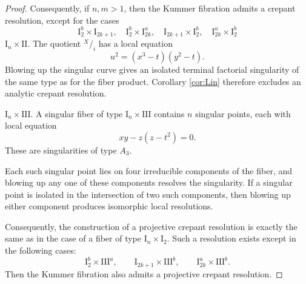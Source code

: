 \documentclass[a4paper]{amsart}
\theoremstyle{plain}
\theoremstyle{definition}
\theoremstyle{remark}
\numberwithin{equation}{section}
\newcommand*\quot[2]{{^{\textstyle #1}\big/_{\textstyle #2}}}
\newcommand{\diag}{\operatorname{diag}}
\begin{document}
\begin{proof}
Consequently, if $n,m>1$, then the Kummer fibration admits a crepant resolution, except for the cases
\[
\mathrm{I}_{2}^{b}\times \mathrm{I}_{2k+1}, \quad \mathrm{I}_{2}^{b}\times \mathrm{I}_{2k}^{a}, \quad \mathrm{I}_{2k+1}\times \mathrm{I}_{2}^{b}, \quad \mathrm{I}_{2k}^{a}\times \mathrm{I}_{2}^{b}
\]
%
\vspace{2mm}
\medskip
\noindent\emph{$\mathrm{I}_n \times \mathrm{II}$}.
The quotient $\quot{X}{i}$ has a local equation
\[
u^{2}=(x^{3}-t)(y^{2}-t).
\]
Blowing up the singular curve gives an isolated terminal factorial
singularity of the same type as for the fiber product.  Corollary
\ref{cor:Lin} therefore excludes an analytic crepant
resolution.

\vspace{2mm}
\medskip
\noindent\emph{$\mathrm{I}_n \times \mathrm{III}$}.
A singular fiber of type $\mathrm{I}_{n}\times\mathrm{III}$ contains
$n$ singular points, each with local equation
\[
xy-z(z-t^{2})=0.
\]
These are singularities of type $A_{3}$.

Each such singular point lies on four irreducible components of the
fiber, and blowing up any one of these components resolves the
singularity. If a singular point is isolated in the intersection of two
such components, then blowing up either component produces isomorphic
local resolutions.

Consequently, the construction of a projective crepant resolution is
exactly the same as in the case of a fiber of type
$\mathrm{I}_{n}\times\mathrm{I}_{2}$. Such a resolution exists except
in the following cases:
\[
\mathrm{I}_{2}^{b}\times\mathrm{III}^{a},\qquad
\mathrm{I}_{2k+1}\times\mathrm{III}^{b},\qquad
\mathrm{I}_{2k}^{a}\times\mathrm{III}^{b}.
\]
Then the Kummer fibration also admits a projective crepant resolution.


\end{proof}
\end{document}
